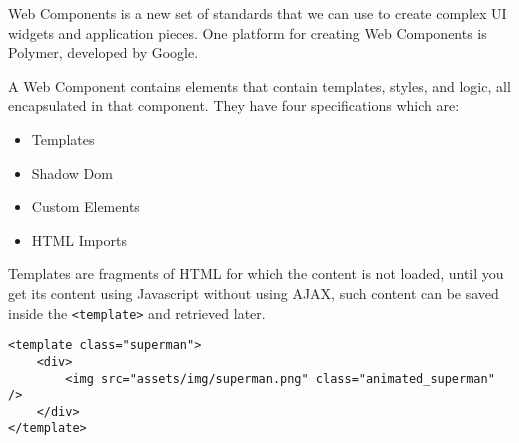 
Web Components is a new set of standards that we can use to create complex UI widgets and application pieces. One platform
for creating Web Components is Polymer, developed by Google.

A Web Component contains elements that contain templates, styles, and logic, all encapsulated in that component. They have
four specifications which are:

\begin{itemize}
    \item Templates
    \item Shadow Dom
    \item Custom Elements
    \item HTML Imports
\end{itemize}

Templates are fragments of HTML for which the content is not loaded, until you get its content using Javascript without
using AJAX, such content can be saved inside the \texttt{<template>} and retrieved later.

\begin{lstlisting}
<template class="superman">
    <div>
        <img src="assets/img/superman.png" class="animated_superman" />
    </div>
</template>
\end{lstlisting}

\label{sec:firstSection}

\blindtext

\blindenumerate

\label{ssec:firstSubSection}

\blindtext

\blinditemize

\blindtext

\blinddescription

 \label{sssec:example01}

\blindtext

\blindmathpaper